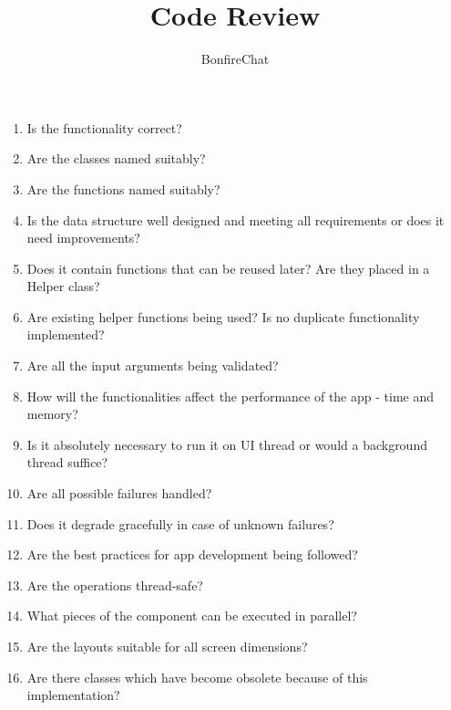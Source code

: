 \documentclass[accentcolor=tud2d,12pt,paper=a4,colorbacktitle]{tudexercise}
\title{Code Review}
\subtitle{BonfireChat}
\begin{document}
  \maketitle

  \begin{enumerate}[ 1.]
    \item Is the functionality correct?
    \item Are the classes named suitably?
    \item Are the functions named suitably?
    \item Is the data structure well designed and meeting all requirements or does it need improvements?
    \item Does it contain functions that can be reused later? Are they placed in a Helper class?
    \item Are existing helper functions being used? Is no duplicate functionality implemented?
    \item Are all the input arguments being validated?
    \item How will the functionalities affect the performance of the app - time and memory?
    \item Is it absolutely necessary to run it on UI thread or would a background thread suffice?
    \item Are all possible failures handled?
    \item Does it degrade gracefully in case of unknown failures?
    \item Are the best practices for app development being followed?
    \item Are the operations thread-safe?
    \item What pieces of the component can be executed in parallel?
    \item Are the layouts suitable for all screen dimensions?
    \item Are there classes which have become obsolete because of this implementation?
  \end{enumerate}
\end{document}
